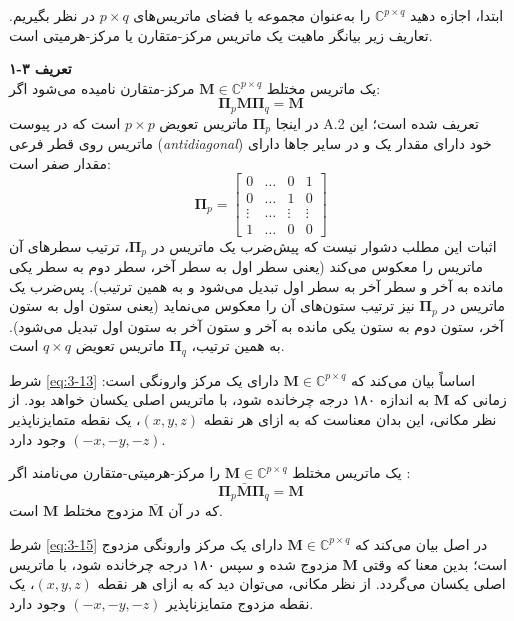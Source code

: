 ابتدا، اجازه دهید $\mathbb{C}^{p \times q}$ را به‌عنوان مجموعه یا فضای ماتریس‌های $p \times q$ در نظر بگیریم. تعاریف زیر بیانگر ماهیت یک ماتریس مرکز-متقارن یا مرکز-هرمیتی است.

\textbf{تعریف ۳-۱} \\
یک ماتریس مختلط $\bm{M} \in \mathbb{C}^{p \times q}$ مرکز-متقارن نامیده می‌شود \cite{1, 5} اگر:
\begin{equation}
	\bm{\Pi}_p \bm{M} \bm{\Pi}_q = \bm{M}
	\label{eq:3-13}
\end{equation}
در اینجا $\bm{\Pi}_p$ ماتریس تعویض $p \times p$ است که در پیوست A.2 تعریف شده است؛ این ماتریس روی قطر فرعی (\textit{antidiagonal}) خود دارای مقدار یک و در سایر جاها دارای مقدار صفر است:
\begin{equation}
	\bm{\Pi}_p = 
	\begin{bmatrix}
		0 & \dots & 0 & 1 \\
		0 & \dots & 1 & 0 \\
		\vdots & \dots & \vdots & \vdots \\
		1 & \dots & 0 & 0
	\end{bmatrix}
	\label{eq:3-14}
\end{equation}
اثبات این مطلب دشوار نیست که پیش‌ضرب یک ماتریس در $\bm{\Pi}_p$، ترتیب سطرهای آن ماتریس را معکوس می‌کند (یعنی سطر اول به سطر آخر، سطر دوم به سطر یکی مانده به آخر و سطر آخر به سطر اول تبدیل می‌شود و به همین ترتیب). پس‌ضرب یک ماتریس در $\bm{\Pi}_p$ نیز ترتیب ستون‌های آن را معکوس می‌نماید (یعنی ستون اول به ستون آخر، ستون دوم به ستون یکی مانده به آخر و ستون آخر به ستون اول تبدیل می‌شود). به همین ترتیب، $\bm{\Pi}_q$ ماتریس تعویض $q \times q$ است.

شرط \eqref{eq:3-13} اساساً بیان می‌کند که $\bm{M} \in \mathbb{C}^{p \times q}$ دارای یک مرکز وارونگی است: زمانی که $\bm{M}$ به اندازه ۱۸۰ درجه چرخانده شود، با ماتریس اصلی یکسان خواهد بود. از نظر مکانی، این بدان معناست که به ازای هر نقطه $(x, y, z)$، یک نقطه متمایزناپذیر $(-x, -y, -z)$ وجود دارد.

یک ماتریس مختلط $\bm{M} \in \mathbb{C}^{p \times q}$ را مرکز-هرمیتی-متقارن می‌نامند اگر \cite{1, 5}:
\begin{equation}
	\bm{\Pi}_p \bar{\bm{M}} \bm{\Pi}_q = \bm{M}
	\label{eq:3-15}
\end{equation}
که در آن $\bar{\bm{M}}$ مزدوج مختلط $\bm{M}$ است.

شرط \eqref{eq:3-15} در اصل بیان می‌کند که $\bm{M} \in \mathbb{C}^{p \times q}$ دارای یک مرکز وارونگی مزدوج است؛ بدین معنا که وقتی $\bm{M}$ مزدوج شده و سپس ۱۸۰ درجه چرخانده شود، با ماتریس اصلی یکسان می‌گردد. از نظر مکانی، می‌توان دید که به ازای هر نقطه $(x, y, z)$، یک نقطه مزدوج متمایزناپذیر $(-x, -y, -z)$ وجود دارد.

